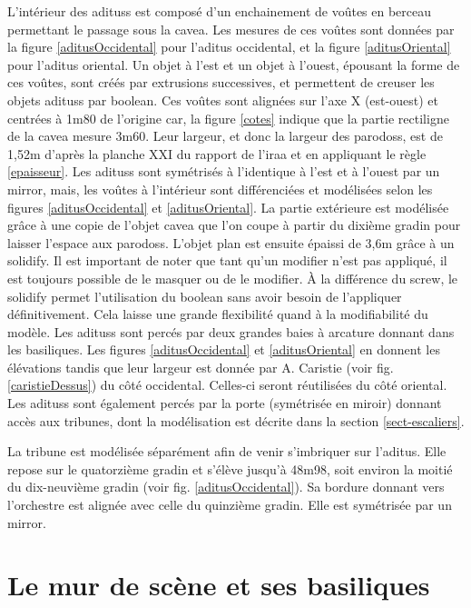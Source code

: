 L'intérieur des \glspl{aditus} est composé d'un enchainement de voûtes en berceau permettant le passage sous la \gls{cavea}. Les mesures de ces voûtes sont données par la figure \ref{aditusOccidental} pour l'\gls{aditus} occidental, et la figure \ref{aditusOriental} pour l'\gls{aditus} oriental. Un objet à l'est et un objet à l'ouest, épousant la forme de ces voûtes, sont créés par extrusions successives, et permettent de creuser les objets \glspl{aditus} par \gls{boolean}. Ces voûtes sont alignées sur l'axe X (est-ouest) et centrées à 1m80 de l'origine car, la figure \ref{cotes} indique que la partie rectiligne de la \gls{cavea} mesure 3m60. Leur largeur, et donc la largeur des \glspl{parodos}, est de 1,52m d'après la planche XXI du rapport de l'\gls{iraa}\cite[Pl. XXI]{orangePl} et en appliquant le règle \ref{epaisseur}. Les \glspl{aditus} sont symétrisés à l'identique à l'est et à l'ouest par un \gls{mirror}, mais, les voûtes à l'intérieur sont différenciées et modélisées selon les figures \ref{aditusOccidental} et \ref{aditusOriental}. La partie extérieure est modélisée grâce à une copie de l'objet \gls{cavea} que l'on coupe à partir du dixième gradin pour laisser l'espace aux \glspl{parodos}. L'objet plan est ensuite épaissi de 3,6m grâce à un \gls{solidify}. Il est important de noter que tant qu'un \gls{modifier} n'est pas appliqué, il est toujours possible de le masquer ou de le modifier. À la différence du \gls{screw}, le \gls{solidify} permet l'utilisation du \gls{boolean} sans avoir besoin de l'appliquer définitivement. Cela laisse une grande flexibilité quand à la modifiabilité du modèle. Les \glspl{aditus} sont percés par deux grandes baies à arcature donnant dans les basiliques. Les figures \ref{aditusOccidental} et \ref{aditusOriental} en donnent les élévations tandis que leur largeur est donnée par A. Caristie (voir fig. \ref{caristieDessus}) du côté occidental. Celles-ci seront réutilisées du côté oriental. Les \glspl{aditus} sont également percés par la porte (symétrisée en miroir) donnant accès aux tribunes, dont la modélisation est décrite dans la section \ref{sect-escaliers}.

La tribune est modélisée séparément afin de venir s'imbriquer sur l'\gls{aditus}. Elle repose sur le quatorzième gradin et s'élève jusqu'à 48m98, soit environ la moitié du dix-neuvième gradin (voir fig. \ref{aditusOccidental}). Sa bordure donnant vers l'orchestre est alignée avec celle du quinzième gradin. Elle est symétrisée par un \gls{mirror}.

\section{Le mur de scène et ses \glspl{basilique}} 
\label{mur}



